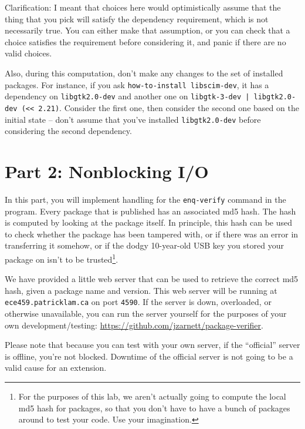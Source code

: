 \documentclass[12pt]{article}
\renewcommand{\_}{\kern-1.5pt\textunderscore\kern-1.5pt}
\begin{document}
\vspace{1em}
Clarification: I meant that choices here would optimistically assume that the thing that you pick will satisfy the dependency requirement, which is not necessarily true. You can either make that assumption, or you can check that a choice satisfies the requirement before considering it, and panic if there are no valid choices.

\vspace*{1em}
Also, during this computation, don't make any changes to the set of installed packages. For instance, if you ask \texttt{how-to-install libscim-dev}, it has a dependency on \verb+libgtk2.0-dev+ and another one on \verb+libgtk-3-dev | libgtk2.0-dev (<< 2.21)+. Consider the first one, then consider the second one based on the initial state -- don't assume that you've installed \verb+libgtk2.0-dev+ before considering the second dependency.


\vspace{\baselineskip}
\section*{Part 2: Nonblocking I/O }\par

In this part, you will implement handling for the \texttt{enq-verify} command in the program. Every package that is published has an associated md5 hash. The hash is computed by looking at the package itself. In principle, this hash can be used to check whether the package has been tampered with, or if there was an error in transferring it somehow, or if the dodgy 10-year-old USB key you stored your package on isn't to be trusted\footnote{For the purposes of this lab, we aren't actually going to compute the local md5 hash for packages, so that you don't have to have a bunch of packages around to test your code. Use your imagination.}.\par

\vspace{1em}
We have provided a little web server that can be used to retrieve the correct md5 hash, given a package name and version. This web server will be running at \texttt{ece459.patricklam.ca} on port \texttt{4590}. If the server is down, overloaded, or otherwise unavailable, you can run the server yourself for the purposes of your own development/testing: \url{https://github.com/jzarnett/package-verifier}. 

Please note that because you can test with your own server, if the ``official'' server is offline, you're not blocked. Downtime of the official server is not going to be a valid cause for an extension.
\end{document}
